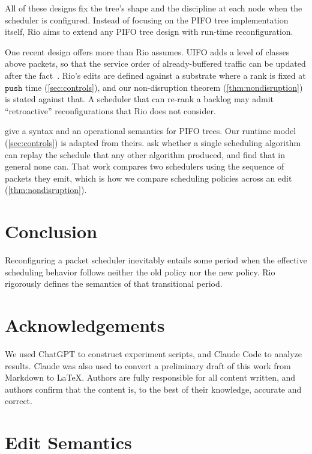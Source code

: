 \documentclass[sigplan,anonymous,review,nonacm]{acmart}
\newcommand{\push}{\ensuremath{\mathtt{push}}}
\begin{document}
All of these designs fix the tree's shape and the discipline at each node when the scheduler is configured.
Instead of focusing on the PIFO tree implementation itself, Rio aims to extend any PIFO tree design with run-time reconfiguration.

One recent design offers more than Rio assumes.
UIFO adds a level of classes above packets, so that the service order of already-buffered traffic can be updated after the fact~\cite{Wang26}.
Rio's edits are defined against a substrate where a rank is fixed at \push{} time (\cref{sec:controls}), and our non-disruption theorem (\cref{thm:nondisruption}) is stated against that.
A scheduler that can re-rank a backlog may admit ``retroactive'' reconfigurations that Rio does not consider.

\citet{Mohan23} give a syntax and an operational semantics for PIFO trees.
Our runtime model (\cref{sec:controls}) is adapted from theirs.
\citet{Mittal16} ask whether a single scheduling algorithm can replay the schedule that any other algorithm produced, and find that in general none can.
That work compares two schedulers using the sequence of packets they emit, which is how we compare scheduling policies across an edit (\cref{thm:nondisruption}).

\section{Conclusion}\label{sec:concl}

Reconfiguring a packet scheduler inevitably entails some period
when the effective scheduling behavior follows neither the old policy nor the new policy.
Rio rigorously defines the semantics of that transitional period.





\section{Acknowledgements}\label{sec:ack}

We used ChatGPT to construct experiment scripts, and Claude Code to analyze results. 
Claude was also used to convert a preliminary draft of this work from Markdown to \LaTeX.
Authors are fully responsible for all content written, and authors confirm that the content is, to the best of their knowledge, accurate and correct.

\appendix

\section{Edit Semantics}\label{sec:edit-semantics-full}
\end{document}
